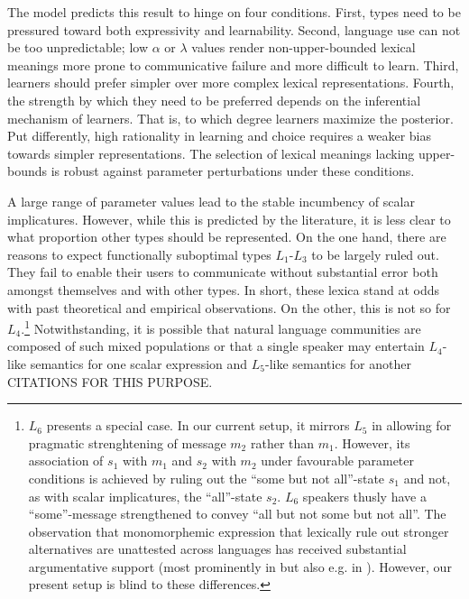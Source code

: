 \documentclass[a4paper]{article}
\newcommand{\hl}[1]{\textcolor[rgb]{.8,.33,.0}{#1}}%
\begin{document}
The model predicts this result to hinge on four conditions. First, types need to be pressured toward both expressivity and learnability. Second, language use can not be too unpredictable; low $\alpha$ or $\lambda$ values render non-upper-bounded lexical meanings more prone to communicative failure and more difficult to learn. Third, learners should prefer simpler over more complex lexical representations. Fourth, the strength by which they need to be preferred depends on the inferential mechanism of learners. That is, to which degree learners maximize the posterior. Put differently, high rationality in learning and choice requires a weaker bias towards simpler representations. The selection of lexical meanings lacking upper-bounds is robust against parameter perturbations under these conditions.

A large range of parameter values lead to the stable incumbency of scalar implicatures. However, while this is predicted by the literature, it is less clear to what proportion other types should be represented. On the one hand, there are  reasons to expect functionally suboptimal types $L_1$-$L_3$ to be largely ruled out. They fail to enable their users to communicate without substantial error both amongst themselves and with other types. In short, these lexica stand at odds with past theoretical and empirical observations. On the other, this is not so for $L_4$.\footnote{$L_6$ presents a special case. In our current setup, it mirrors $L_5$ in allowing for pragmatic strenghtening of message $m_2$ rather than $m_1$. However, its association of $s_1$ with $m_1$ and $s_2$ with $m_2$ under favourable parameter conditions is achieved by ruling out the ``some but not all''-state $s_1$ and not, as with scalar implicatures, the ``all''-state $s_2$. $L_6$ speakers thusly have a ``some''-message strengthened to convey ``all but not some but not all''. The observation that monomorphemic expression that lexically rule out stronger alternatives are unattested across languages has received substantial argumentative support (most prominently in \citealt[252-267]{horn:1984} but also e.g. in \citealt{horn:1972,traugott:2004,vdAuwera:2010}). However, our present setup is blind to these differences.} Notwithstanding, it is possible that natural language communities are composed of such mixed populations or that a single speaker may entertain $L_4$-like semantics for one scalar expression and $L_5$-like semantics for another \hl{CITATIONS FOR THIS PURPOSE}.   
\end{document}
